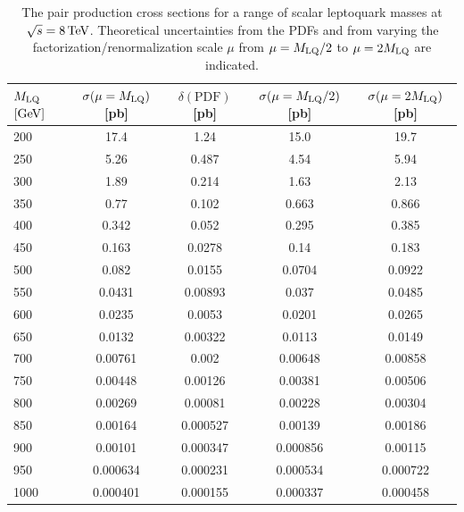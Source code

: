 \begin{table}[htb]
\begin{center}
{\footnotesize
\begin{tabular}{|l||c|c||c|c|}
\hline
$M_{\text{LQ}}$ $[\text{Ge\hspace{-.08em}V}]$ & $\sigma (\mu = M_{\text{LQ}})$ [pb] & $\delta (\text{PDF})$ [pb] & $\sigma (\mu = M_{\text{LQ}}/2)$ [pb] & $\sigma (\mu = 2M_{\text{LQ}})$ [pb] \\
\hline
\hline
 200 & 17.4 & 1.24 & 15.0 & 19.7  \\
 250 & 5.26 & 0.487 & 4.54 & 5.94  \\
 300 & 1.89 & 0.214 & 1.63 & 2.13  \\
 350 & 0.77 & 0.102 & 0.663 & 0.866  \\
 400 & 0.342 & 0.052 & 0.295 & 0.385  \\
 450 & 0.163 & 0.0278 & 0.14 & 0.183  \\
 500 & 0.082 & 0.0155 & 0.0704 & 0.0922  \\
 550 & 0.0431 & 0.00893 & 0.037 & 0.0485  \\
 600 & 0.0235 & 0.0053 & 0.0201 & 0.0265  \\
 650 & 0.0132 & 0.00322 & 0.0113 & 0.0149  \\
 700 & 0.00761 & 0.002 & 0.00648 & 0.00858  \\
 750 & 0.00448 & 0.00126 & 0.00381 & 0.00506  \\
 800 & 0.00269 & 0.00081 & 0.00228 & 0.00304  \\
 850 & 0.00164 & 0.000527 & 0.00139 & 0.00186  \\
 900 & 0.00101 & 0.000347 & 0.000856 & 0.00115  \\
 950 & 0.000634 & 0.000231 & 0.000534 & 0.000722  \\
 1000 & 0.000401 & 0.000155 & 0.000337 & 0.000458  \\
\hline
\end{tabular}
}
\caption{The pair production cross sections for a range of scalar leptoquark masses at $\sqrt{s}=8\,\text{Te\hspace{-.08em}V}$. Theoretical uncertainties from the PDFs and from varying the factorization/renormalization scale $\mu$ from $\mu=M_{\text{LQ}}/2$ to $\mu=2M_{\text{LQ}}$ are indicated.}
\label{tab:lq-xsec}
\end{center}
\end{table}

